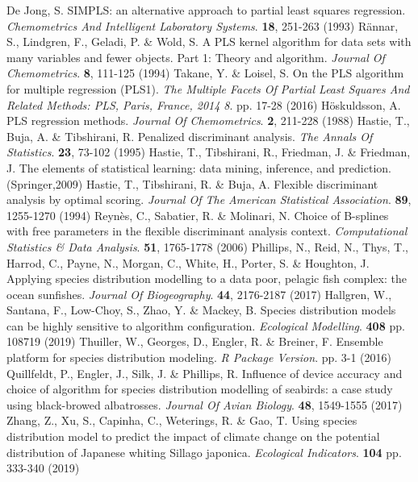 \documentclass[sn-mathphys-num]{sn-jnl}%
\begin{document}
\begin{thebibliography}{000}
De Jong, S. SIMPLS: an alternative approach to partial least squares regression. {\em Chemometrics And Intelligent Laboratory Systems}. \textbf{18}, 251-263 (1993)
Rännar, S., Lindgren, F., Geladi, P. \& Wold, S. A PLS kernel algorithm for data sets with many variables and fewer objects. Part 1: Theory and algorithm. {\em Journal Of Chemometrics}. \textbf{8}, 111-125 (1994)
Takane, Y. \& Loisel, S. On the PLS algorithm for multiple regression (PLS1). {\em The Multiple Facets Of Partial Least Squares And Related Methods: PLS, Paris, France, 2014 8}. pp. 17-28 (2016)
Höskuldsson, A. PLS regression methods. {\em Journal Of Chemometrics}. \textbf{2}, 211-228 (1988)
Hastie, T., Buja, A. \& Tibshirani, R. Penalized discriminant analysis. {\em The Annals Of Statistics}. \textbf{23}, 73-102 (1995)
Hastie, T., Tibshirani, R., Friedman, J. \& Friedman, J. The elements of statistical learning: data mining, inference, and prediction. (Springer,2009)
Hastie, T., Tibshirani, R. \& Buja, A. Flexible discriminant analysis by optimal scoring. {\em Journal Of The American Statistical Association}. \textbf{89}, 1255-1270 (1994)
Reynès, C., Sabatier, R. \& Molinari, N. Choice of B-splines with free parameters in the flexible discriminant analysis context. {\em Computational Statistics & Data Analysis}. \textbf{51}, 1765-1778 (2006)
Phillips, N., Reid, N., Thys, T., Harrod, C., Payne, N., Morgan, C., White, H., Porter, S. \& Houghton, J. Applying species distribution modelling to a data poor, pelagic fish complex: the ocean sunfishes. {\em Journal Of Biogeography}. \textbf{44}, 2176-2187 (2017)
Hallgren, W., Santana, F., Low-Choy, S., Zhao, Y. \& Mackey, B. Species distribution models can be highly sensitive to algorithm configuration. {\em Ecological Modelling}. \textbf{408} pp. 108719 (2019)
Thuiller, W., Georges, D., Engler, R. \& Breiner, F. Ensemble platform for species distribution modeling. {\em R Package Version}. pp. 3-1 (2016)
Quillfeldt, P., Engler, J., Silk, J. \& Phillips, R. Influence of device accuracy and choice of algorithm for species distribution modelling of seabirds: a case study using black-browed albatrosses. {\em Journal Of Avian Biology}. \textbf{48}, 1549-1555 (2017)
Zhang, Z., Xu, S., Capinha, C., Weterings, R. \& Gao, T. Using species distribution model to predict the impact of climate change on the potential distribution of Japanese whiting Sillago japonica. {\em Ecological Indicators}. \textbf{104} pp. 333-340 (2019)

\end{thebibliography}
\end{document}
